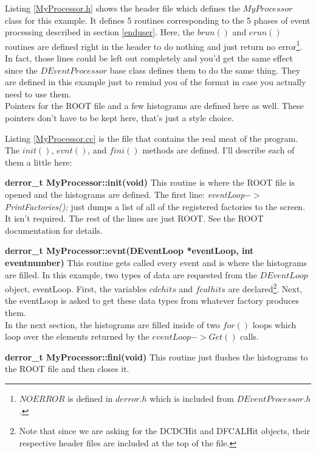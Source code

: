\documentclass[12pt]{article}
\begin{document}


\newpage
Listing \ref{MyProcessor.h} shows the header file which defines the
$MyProcessor$ class for this example. It defines 5 routines
corresponding to the 5
phases of event processing described in section \ref{enduser}. Here,
the $brun()$ and $erun()$ routines are defined right in the header
to do nothing and just return no error\footnote{$NOERROR$ is defined
in $derror.h$ which is included from $DEventProcessor.h$.}. 
In fact, those lines could be left out completely and you'd get the
same effect since the $DEventProcessor$ base class defines them
to do the same thing. They are defined in this example just to
remind you of the format in case you actually need to use them.\\

Pointers for the ROOT file and a few histograms are defined
here as well. These pointers don't have to be kept here, that's
just a style choice.



\newpage
Listing \ref{MyProcessor.cc} is the file that contains the real meat
of the program. The $init()$, $evnt()$, and $fini()$ methods
are defined. I'll describe each of them a little here:

\begin{description}
\item{\bf derror\_t MyProcessor::init(void)}
This routine is where the ROOT file is opened and the histograms are
defined. The first line: {\it eventLoop$->$PrintFactories();} just
dumps a list of all of the registered factories to the screen. It isn't
required. The rest of the lines are just ROOT. See the ROOT documentation
for details.

\item{\bf derror\_t MyProcessor::evnt(DEventLoop *eventLoop, int eventnumber)}
This routine gets called every event and is where the histograms
are filled. In this example, two types of data are requested from
the $DEventLoop$ object, eventLoop. First, the variables $cdchits$ and
$fcalhits$ are declared\footnote{Note that since we are asking for
the DCDCHit and DFCALHit objects, their respective header files are
included at the top of the file.}. Next, the eventLoop is asked to
get these data types from whatever factory produces them.\\

In the next section, the histograms are filled inside of
two $for()$ loops which loop over the elements returned by
the $eventLoop->Get()$ calls.\\

\item{\bf derror\_t MyProcessor::fini(void)}
This routine just flushes the histograms to the ROOT file and then closes it.
\end{description}
\end{document}
